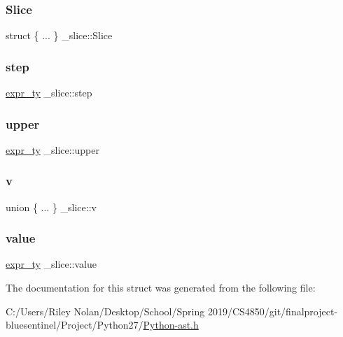 \mbox{\label{struct__slice_a3ced7266b77b6f06f45a30747fa88e76}} 
\subsubsection{\texorpdfstring{Slice}{Slice}}
{\footnotesize\ttfamily struct \{ ... \}   \+\_\+slice\+::\+Slice}

\mbox{\label{struct__slice_ace8e2eccc20477db2a1ac90d267154b2}} 
\subsubsection{\texorpdfstring{step}{step}}
{\footnotesize\ttfamily \mbox{\hyperlink{_python-ast_8h_a56d3705e020a071405094a220c4592bd}{expr\+\_\+ty}} \+\_\+slice\+::step}

\mbox{\label{struct__slice_a9535a1f77a13185667a1be7eacd5f557}} 
\subsubsection{\texorpdfstring{upper}{upper}}
{\footnotesize\ttfamily \mbox{\hyperlink{_python-ast_8h_a56d3705e020a071405094a220c4592bd}{expr\+\_\+ty}} \+\_\+slice\+::upper}

\mbox{\label{struct__slice_a60bb76561c60164951048efe2222a44e}} 
\subsubsection{\texorpdfstring{v}{v}}
{\footnotesize\ttfamily union \{ ... \}   \+\_\+slice\+::v}

\mbox{\label{struct__slice_af026e3a8887c949516ce9a869cf73fb4}} 
\subsubsection{\texorpdfstring{value}{value}}
{\footnotesize\ttfamily \mbox{\hyperlink{_python-ast_8h_a56d3705e020a071405094a220c4592bd}{expr\+\_\+ty}} \+\_\+slice\+::value}



The documentation for this struct was generated from the following file\+:\begin{DoxyCompactItemize}
\item 
C\+:/\+Users/\+Riley Nolan/\+Desktop/\+School/\+Spring 2019/\+C\+S4850/git/finalproject-\/bluesentinel/\+Project/\+Python27/\mbox{\hyperlink{_python-ast_8h}{Python-\/ast.\+h}}\end{DoxyCompactItemize}
